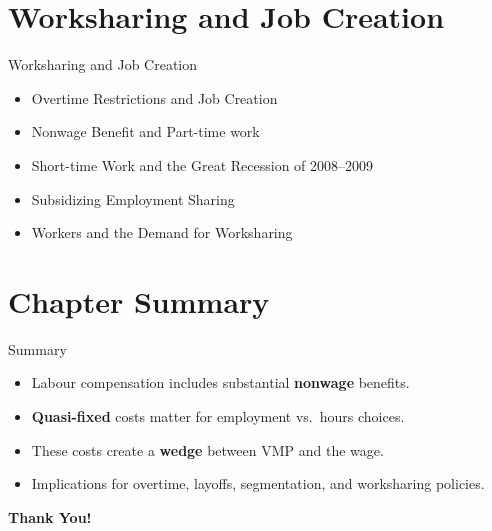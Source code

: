 \documentclass[aspectratio=169]{beamer}
\begin{document}
\section{Worksharing and Job Creation}

\begin{frame}{Worksharing and Job Creation}
\transfade
\begin{itemize}[<+->]
  \item Overtime Restrictions and Job Creation
  \item Nonwage Benefit and Part-time work
  \item Short-time Work and the Great Recession of 2008--2009
  \item Subsidizing Employment Sharing
  \item Workers and the Demand for Worksharing
\end{itemize}
\end{frame}

\section{Chapter Summary}

\begin{frame}{Summary}
\transfade
\begin{itemize}[<+->]
  \item Labour compensation includes substantial \textbf{nonwage} benefits.
  \item \textbf{Quasi-fixed} costs matter for employment vs.\ hours choices.
  \item These costs create a \textbf{wedge} between VMP and the wage.
  \item Implications for overtime, layoffs, segmentation, and worksharing policies.
\end{itemize}
\end{frame}

\begin{frame}
\centering
\Huge{\textbf{Thank You!}} \\

\end{frame}
\end{document}
